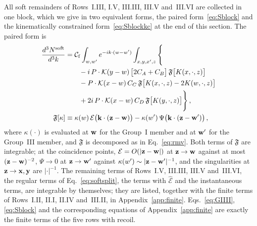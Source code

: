 All soft remainders of Rows~I.III, I.V, III.III, III.V and~III.VI are collected in one block, which we give in two equivalent forms, the paired form~\eqref{eq:Sblock} and the kinematically constrained form~\eqref{eq:Sblockkc} at the end of this section. The paired form is
\begin{align}\label{eq:Sblock}
\frac{d^3N^{\rm soft}}{d^3k}&=\mathcal C_{\rm f}\int_{w,w'}e^{-ik\cdot(w-w')}\int_{x,y,x',z}\Bigg\{\notag\\&\qquad-i\,P\cdot\mathcal{K}(y-w)\,\big[2C_A+C_B\big]\,\mathfrak F\big[K(x,\cdot,z)\big]\notag\\
&\qquad-P\cdot\mathcal{K}(x-w)\,C_C\,\mathfrak F\big[K(x,\cdot,z)-2K(w,\cdot,z)\big]\notag\\&\qquad+2i\,P\cdot\mathcal{K}(x-w)\,C_D\,\mathfrak F\big[K(y,\cdot,z)\big]\Bigg\}\,,\notag\\
\mathfrak F[\kappa]&\equiv\kappa(w)\,\mathcal E\big(\mathbf{k}\cdot(\mathbf{z}-\mathbf{w})\big)-\kappa(w')\,\Psi\big(\mathbf{k}\cdot(\mathbf{z}-\mathbf{w}')\big)\,,
\end{align}
where $\kappa(\cdot)$ is evaluated at $\mathbf{w}$ for the Group~I member and at $\mathbf{w}'$ for the Group~III member, and $\mathfrak F$ is decomposed as in Eq.~\eqref{eq:rmv}. Both terms of $\mathfrak F$ are integrable; at the coincidence points, $\mathcal E=O(|\mathbf{z}-\mathbf{w}|)$ at $\mathbf{z}\to\mathbf{w}$ against at most $(\mathbf{z}-\mathbf{w})^{-2}$, $\Psi\to0$ at $\mathbf{z}\to\mathbf{w}'$ against $\kappa(w')\sim|\mathbf{z}-\mathbf{w}'|^{-1}$, and the singularities at $\mathbf{z}\to\mathbf{x},\mathbf{y}$ are $|\cdot|^{-1}$. The remaining terms of Rows~I.V, III.III, III.V and~III.VI, the regular terms of Eq.~\eqref{eq:softsplit}, the terms with $\widehat{\mathcal E}$ and the instantaneous terms, are integrable by themselves; they are listed, together with the finite terms of Rows~I.II, II.I, II.IV and~III.II, in Appendix~\ref{app:finite}. Eqs.~\eqref{eq:GIIII}, \eqref{eq:Sblock} and the corresponding equations of Appendix~\ref{app:finite} are exactly the finite terms of the five rows with recoil.

